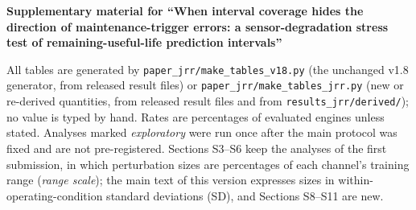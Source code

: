 \documentclass[10pt,a4paper]{article}
\newif\ifanon
\begin{document}
\begin{center}
{\large\bfseries Supplementary material for ``When interval coverage hides the direction of maintenance-trigger errors: a sensor-degradation stress test of remaining-useful-life prediction intervals''\par}
\ifanon\else\vspace{0.3em}{\small Yi Wang, Lishui University\par}\fi
\end{center}
\small
\noindent All tables are generated by \texttt{paper\_jrr/make\_tables\_v18.py} (the unchanged v1.8 generator, from released result files) or \texttt{paper\_jrr/make\_tables\_jrr.py} (new or re-derived quantities, from released result files and from \texttt{results\_jrr/derived/}); no value is typed by hand. Rates are percentages of evaluated engines unless stated. Analyses marked \emph{exploratory} were run once after the main protocol was fixed and are not pre-registered. Sections S3--S6 keep the analyses of the first submission, in which perturbation sizes are percentages of each channel's training range (\emph{range scale}); the main text of this version expresses sizes in within-operating-condition standard deviations (SD), and Sections S8--S11 are new.
\end{document}
